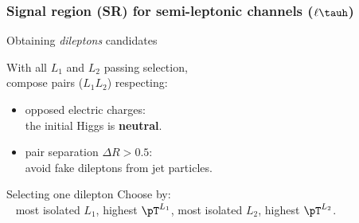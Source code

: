 \begin{frame}
\frametitle{Signal region (SR) for semi-leptonic channels ($\ell\tauh$)}

\begin{block}{Obtaining \emph{dileptons} candidates}
\begin{minipage}[c]{.55\linewidth}
With all $L_1$ and $L_2$ passing selection,\\
compose  pairs ($L_1L_2$) respecting:
\begin{itemize}
\item opposed electric charges:\\ the initial Higgs is \textbf{neutral}.
\item pair separation $\Delta R > \num{0.5}$:\\ avoid fake dileptons from jet particles.
\end{itemize}
\end{minipage}
\begin{minipage}[c]{.4\linewidth}

\end{minipage}
\end{block}
\pause
\begin{block}{Selecting one dilepton}
Choose by:\\
~\hfill
most isolated $L_1$,
\hfill
highest $\pT^{L_1}$,
\hfill
most isolated $L_2$,
\hfill
highest $\pT^{L_2}$.
\hfill~
\end{block}

\end{frame}


